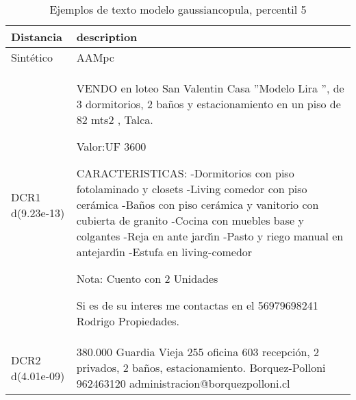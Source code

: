\begin{table}[H]
\centering
\fontsize{10}{14}\selectfont
\caption{Ejemplos de texto modelo gaussiancopula, percentil 5}
\label{table-example-economicos-b-2-gaussiancopula-5p-text}
\begin{tabular}{|l|m{35em}|}
\hline
\rowcolor[gray]{0.8}
Distancia & description \\
\hline Sintético & AAMpc \\
\hline DCR1 d(9.23e-13) & VENDO en loteo San Valentin Casa ''Modelo Lira '', de 3 dormitorios, 2 ba\~nos y estacionamiento en un piso de 82 mts2 , Talca.

Valor:UF 3600

CARACTERISTICAS:
-Dormitorios con piso fotolaminado y closets
-Living comedor con piso cer\'amica
-Ba\~nos con piso cer\'amica y vanitorio con cubierta de granito
-Cocina con muebles base y colgantes
-Reja en ante jard{\'\i}n
-Pasto y riego manual en antejard{\'\i}n
-Estufa en living-comedor
 

Nota: Cuento con 2 Unidades

Si es de su interes me contactas en el 56979698241 Rodrigo Propiedades. \\
\hline DCR2 d(4.01e-09) & 380.000 Guardia Vieja 255 oficina 603 recepci\'on, 2 privados, 2 ba\~nos, estacionamiento. Borquez-Polloni 962463120 administracion@borquezpolloni.cl \\
\hline
\end{tabular}
\end{table}
